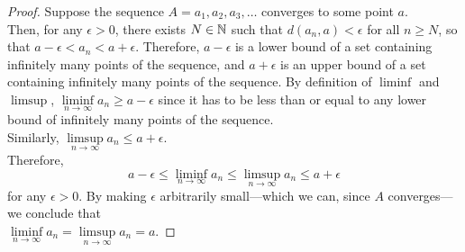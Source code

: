 \begin{answer}
\begin{claim}
    \begin{proof}
      Suppose the sequence $A = a_1, a_2, a_3, \ldots$ converges to some point $a$. \\
      Then, for any $\epsilon > 0$, there exists $N \in \mathbb{N}$ such that
      $d(a_n, a) < \epsilon$ for all $n \geq N$,
      so that $a - \epsilon < a_n < a + \epsilon$.
      Therefore, $a - \epsilon$ is a lower bound of a set containing
      infinitely many points of the sequence,
      and $a + \epsilon$ is an upper bound of a set containing
      infinitely many points of the sequence.
      By definition of $\liminf$ and $\limsup$,
      $\liminf\limits_{n \to \infty}{a_n} \geq a - \epsilon$
      since it has to be less than or equal to any lower bound of infinitely
      many points of the sequence. \\
      Similarly, $\limsup\limits_{n \to \infty}{a_n} \leq a + \epsilon$.\\
      Therefore,
      \[ a - \epsilon \leq \liminf\limits_{n \to \infty}{a_n} \leq \limsup\limits_{n \to \infty}{a_n} \leq a + \epsilon \]
      for any $\epsilon > 0$.
      By making $\epsilon$ arbitrarily
      small---which we can, since $A$ converges---we conclude that \\
      $\liminf\limits_{n \to \infty}{a_n} = \limsup\limits_{n \to \infty}{a_n} = a$.
    \end{proof}
  \end{claim}
  
\end{answer}
